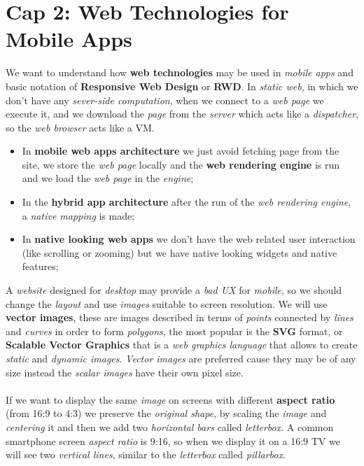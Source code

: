 \documentclass{article}
\begin{document}
\section{Cap 2: Web Technologies for Mobile Apps}
We want to understand how \textbf{web technologies} may be used in \emph{mobile apps} and basic notation of \textbf{Responsive Web Design }or \textbf{RWD}. In \emph{static web}, in which we don't have any \emph{sever-side computation}, when we connect to a \emph{web page} we execute it, and we download the \emph{page} from the \emph{server} which acts like a \emph{dispatcher}, so the \emph{web browser} acts like a VM.
\begin{itemize}
\item In \textbf{mobile web apps architecture }we just avoid fetching page from the site, we store the \emph{web page} locally and the \textbf{web rendering engine} is run and we load the \emph{web page} in the \emph{engine};
\item In the \textbf{hybrid app architecture} after the run of the \emph{web rendering engine}, a \emph{native mapping} is made;
\item In \textbf{native looking web apps} we don't have the web related user interaction (like scrolling or zooming) but we have native looking widgets and native features;
\end{itemize}
A \emph{website} designed for \emph{desktop} may provide a \emph{bad UX} for \emph{mobile}, so we should change the \emph{layout} and use \emph{images} suitable to screen resolution. We will use \textbf{vector images}, these are images described in terms of \emph{points} connected by \emph{lines} and \emph{curves} in order to form \emph{polygons}, the most popular is the \textbf{SVG} format, or \textbf{Scalable Vector Graphics} that is a \emph{web graphics language} that allows to create \emph{static} and \emph{dynamic images}. \emph{Vector images} are preferred cause they may be of any size instead the \emph{scalar images }have their own pixel size.\\\\
 If we want to display the same \emph{image} on screens with different \textbf{aspect ratio} (from 16:9 to 4:3) we preserve the \emph{original shape}, by scaling the \emph{image} and \emph{centering} it and then we add two \emph{horizontal bars} called \emph{letterbox}. A common smartphone screen \emph{aspect ratio} is 9:16, so when we display it on a 16:9 TV we will see two \emph{vertical lines}, similar to the \emph{letterbox} called \emph{pillarbox}.\\\\
\end{document}
